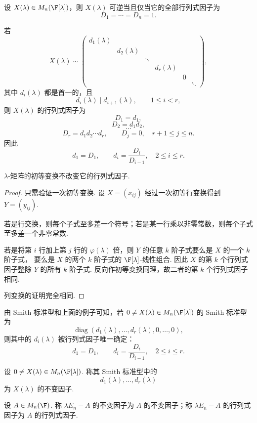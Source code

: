 \begin{example}
	设 $X(\lambda)\in M_n(\F[\lambda])$，则 $X(\lambda)$ 可逆当且仅当它的全部行列式因子为
	\[
	D_1=\cdots=D_n=1.
	\]
\end{example}

\begin{example}
	若
	\[
	X(\lambda)\sim
	\begin{pmatrix}
		d_1(\lambda) \\
		& d_2(\lambda) \\
		&& \ddots \\
		&&& d_r(\lambda) \\
		&&&& 0 \\
		&&&&& \ddots
	\end{pmatrix},
	\]
	其中 $d_i(\lambda)$ 都是首一的，且
	\[
	d_i(\lambda)\mid d_{i+1}(\lambda),\qquad 1\leq i<r,
	\]
	则 $X(\lambda)$ 的行列式因子为
	\[
	D_1=d_1,
	\]
	\[
	D_2=d_1d_2,
	\]
	\[
	\cdots
	\]
	\[
	D_r=d_1d_2\cdots d_r,
	\qquad
	D_j=0,\quad r+1\leq j\leq n.
	\]
	因此
	\[
	d_1=D_1,
	\qquad
	d_i=\frac{D_i}{D_{i-1}},\quad 2\leq i\leq r.
	\]
\end{example}

\begin{lemma}
	$\lambda$-矩阵的初等变换不改变它的行列式因子.
\end{lemma}

\begin{proof}
	只需验证一次初等变换. 设 $X=(x_{ij})$ 经过一次初等行变换得到 $Y=(y_{ij})$.
	
	若是行交换，则每个子式至多差一个符号；若是某一行乘以非零常数，则每个子式至多差一个非零常数.
	
	若是将第 $i$ 行加上第 $j$ 行的 $\varphi(\lambda)$ 倍，则 $Y$ 的任意 $k$ 阶子式要么是 $X$ 的一个 $k$ 阶子式，
	要么是 $X$ 的两个 $k$ 阶子式的 $\F[\lambda]$-线性组合. 因此 $X$ 的第 $k$ 个行列式因子整除 $Y$ 的所有 $k$ 阶子式.
	反向作初等变换同理，故二者的第 $k$ 个行列式因子相同.
	
	列变换的证明完全相同.
\end{proof}


由 Smith 标准型和上面的例子可知，若 $0\neq X(\lambda)\in M_n(\F[\lambda])$ 的 Smith 标准型为
\[
\operatorname{diag}(d_1(\lambda),\ldots,d_r(\lambda),0,\ldots,0),
\]
则其中的 $d_i(\lambda)$ 被行列式因子唯一确定：
\[
d_1=D_1,
\qquad
d_i=\frac{D_i}{D_{i-1}},\quad 2\leq i\leq r.
\]

\begin{definition}
	设 $0\neq X(\lambda)\in M_n(\F[\lambda])$. 称其 Smith 标准型中的
	\[
	d_1(\lambda),\ldots,d_r(\lambda)
	\]
	为 $X(\lambda)$ 的不变因子.
	
	设 $A\in M_n(\F)$. 称 $\lambda E_n-A$ 的不变因子为 $A$ 的不变因子；称 $\lambda E_n-A$ 的行列式因子为 $A$ 的行列式因子.
\end{definition}

